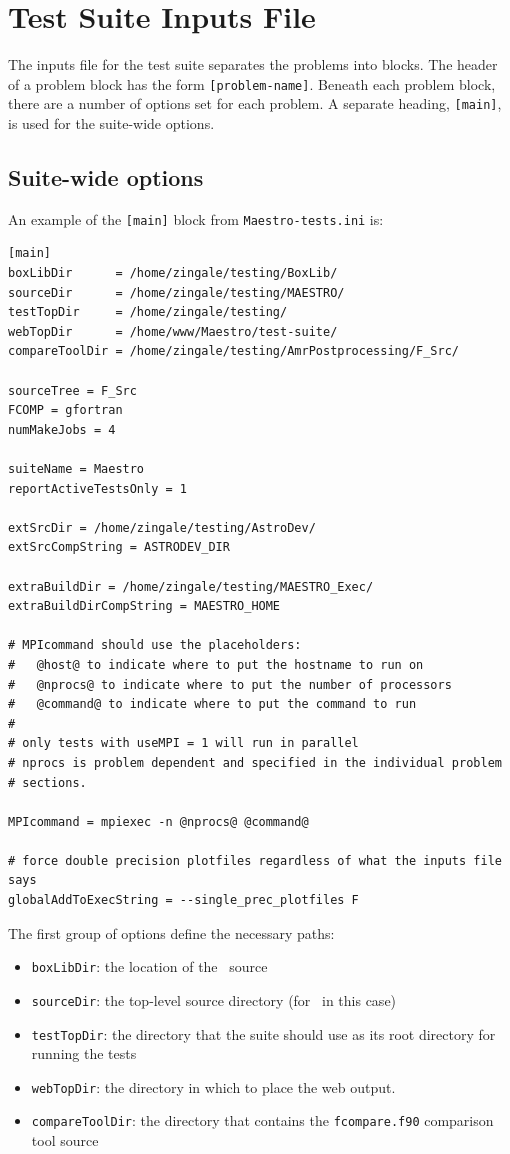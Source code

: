 \section{Test Suite Inputs File}

The inputs file for the test suite separates the problems into blocks.
The header of a problem block has the form {\tt [problem-name]}.
Beneath each problem block, there are a number of options set for each
problem.  A separate heading, {\tt [main]}, is used for the suite-wide
options.

\subsection{Suite-wide options}

An example of the {\tt [main]} block from {\tt Maestro-tests.ini} is:
\begin{lstlisting}
[main]
boxLibDir      = /home/zingale/testing/BoxLib/
sourceDir      = /home/zingale/testing/MAESTRO/
testTopDir     = /home/zingale/testing/
webTopDir      = /home/www/Maestro/test-suite/
compareToolDir = /home/zingale/testing/AmrPostprocessing/F_Src/

sourceTree = F_Src
FCOMP = gfortran
numMakeJobs = 4

suiteName = Maestro
reportActiveTestsOnly = 1

extSrcDir = /home/zingale/testing/AstroDev/
extSrcCompString = ASTRODEV_DIR

extraBuildDir = /home/zingale/testing/MAESTRO_Exec/
extraBuildDirCompString = MAESTRO_HOME

# MPIcommand should use the placeholders:
#   @host@ to indicate where to put the hostname to run on
#   @nprocs@ to indicate where to put the number of processors
#   @command@ to indicate where to put the command to run
#
# only tests with useMPI = 1 will run in parallel
# nprocs is problem dependent and specified in the individual problem
# sections.

MPIcommand = mpiexec -n @nprocs@ @command@

# force double precision plotfiles regardless of what the inputs file says
globalAddToExecString = --single_prec_plotfiles F
\end{lstlisting}

The first group of options define the necessary paths:
\begin{itemize}
\item {\tt boxLibDir}: the location of the \boxlib\ source
\item {\tt sourceDir}: the top-level source directory (for \maestro\ in this case)
\item {\tt testTopDir}: the directory that the suite should use as its
  root directory for running the tests
\item {\tt webTopDir}: the directory in which to place the web output.
\item {\tt compareToolDir}: the directory that contains the {\tt fcompare.f90}
  comparison tool source
\end{itemize}


